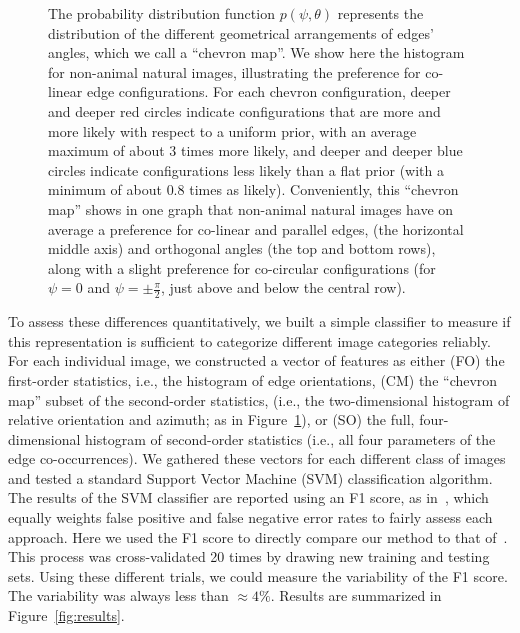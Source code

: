 \documentclass{article}%
\begin{document}
\begin{figure}%
\caption{
The probability distribution function $p(\psi, \theta)$ 
represents the distribution of the different geometrical arrangements of edges' angles, 
which we call a ``chevron map''. 
We show here the histogram for non-animal natural images, 
illustrating the preference for co-linear edge configurations. 
For each chevron configuration, deeper and deeper red circles 
indicate configurations that are more and more likely 
with respect to a uniform prior, %
with an average maximum of about $3$ times more likely, 
and deeper and deeper blue circles indicate configurations less likely 
than a flat prior (with a minimum of about $0.8$ times as likely). 
Conveniently, this ``chevron map'' shows in one graph that non-animal natural images 
have on average a preference for co-linear and parallel edges, 
(the horizontal middle axis) and %
orthogonal angles (the top and bottom rows),
along with a slight preference for co-circular configurations (for $\psi=0$ and $\psi=\pm \frac \pi 2$, just above and below the central row).
\label{fig:chevrons}}%
\end{figure}%
To assess these differences 
quantitatively, we built a simple classifier to measure if this representation 
is sufficient to categorize different image categories reliably. 
For each individual image, we constructed a vector of features as either 
%
(FO) the first-order statistics, i.e., the histogram of edge orientations,
(CM) the ``chevron map'' subset of the second-order statistics, (i.e., the two-dimensional histogram of relative orientation and azimuth; as in Figure~\ref{fig:chevrons}), or 
(SO) the full, four-dimensional histogram of second-order statistics (i.e., all four parameters of the edge co-occurrences).
%
  We gathered these vectors for each different class of images and
  tested a standard Support Vector Machine (SVM) classification
  algorithm.  The results of the SVM classifier are reported using an
  F1 score, as in~\citet{Serre07}, which equally weights false
  positive and false negative error rates to fairly assess each
  approach.  Here we used the F1 score to directly compare our method
  to that of~\citet{Serre07}.  This process was cross-validated 20
  times by drawing new training and testing sets.  Using these
  different trials, we could measure the variability of the F1 score.
  The variability was always less than $\approx 4\%$.
  Results are summarized in Figure~\ref{fig:results}.
\end{document}
